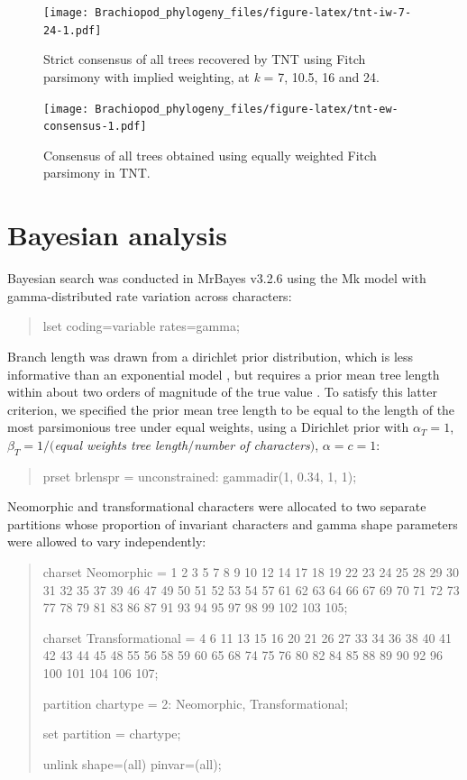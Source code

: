 \documentclass[openany]{book}
\theoremstyle{definition}
\theoremstyle{definition}
\theoremstyle{definition}
\theoremstyle{remark}
\begin{document}
\begin{figure}
\centering
\texttt{[image: Brachiopod\_phylogeny\_files/figure-latex/tnt-iw-7-24-1.pdf]}
\caption{\label{fig:tnt-iw-7-24}Strict consensus of all trees recovered by TNT
using Fitch parsimony with implied weighting, at \emph{k} = 7, 10.5, 16 and 24.}
\end{figure}

\newpage




\begin{figure}
\centering
\texttt{[image: Brachiopod\_phylogeny\_files/figure-latex/tnt-ew-consensus-1.pdf]}
\caption{\label{fig:tnt-ew-consensus}Consensus of all trees obtained using equally weighted
Fitch parsimony in TNT.}
\end{figure}

\hypertarget{bayesian}{\chapter{Bayesian analysis}\label{bayesian}}

Bayesian search was conducted in MrBayes v3.2.6 \citep{Ronquist2012}
using the Mk model \citep{Lewis2001} with gamma-distributed rate
variation across characters:

\begin{quote}
lset coding=variable rates=gamma;
\end{quote}

Branch length was drawn from a dirichlet prior distribution, which is
less informative than an exponential model \citep{Rannala2012}, but
requires a prior mean tree length within about two orders of magnitude
of the true value \citep{Zhang2012}. To satisfy this latter criterion,
we specified the prior mean tree length to be equal to the length of the
most parsimonious tree under equal weights, using a Dirichlet prior with
\(\alpha_T = 1\), \(\beta_T = 1/(\)\emph{equal weights tree
length}\(/\)\emph{number of characters}\()\), \(\alpha = c = 1\):

\begin{quote}
prset brlenspr = unconstrained: gammadir(1, 0.34, 1, 1);
\end{quote}

Neomorphic and transformational characters
\citep[\emph{sensu}][]{Sereno2007} were allocated to two separate
partitions whose proportion of invariant characters and gamma shape
parameters were allowed to vary independently:

\begin{quote}
charset Neomorphic = 1 2 3 5 7 8 9 10 12 14 17 18 19 22 23 24 25 28 29
30 31 32 35 37 39 46 47 49 50 51 52 53 54 57 61 62 63 64 66 67 69 70 71
72 73 77 78 79 81 83 86 87 91 93 94 95 97 98 99 102 103 105;

charset Transformational = 4 6 11 13 15 16 20 21 26 27 33 34 36 38 40 41
42 43 44 45 48 55 56 58 59 60 65 68 74 75 76 80 82 84 85 88 89 90 92 96
100 101 104 106 107;

partition chartype = 2: Neomorphic, Transformational;

set partition = chartype;

unlink shape=(all) pinvar=(all);
\end{quote}
\end{document}
